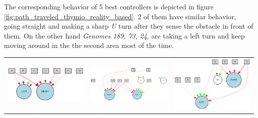 The corresponding behavior of 5 best controllers is depicted in figure \ref{fig:path_traveled_thymio_reality_based}. 2 of them have similar behavior, going straight and making a sharp \emph{U} turn after they sense the obstacle in front of them. On the other hand \emph{Genomes 189, 73, 24}, are taking a left turn and keep moving around in the the second area most of the time.


\begin{table}[h]
\centering
\begin{tabular}{ccc}
\includegraphics[scale=0.4]{include/images/thymio_network_379.PNG} & \includegraphics[scale=0.4]{include/images/thymio_network_78.PNG} & \includegraphics[scale=0.4]{include/images/thymio_network_73.PNG} \\

\end{tabular}
\end{table}
